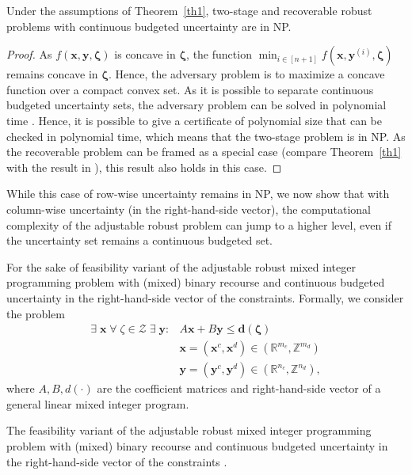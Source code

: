 \begin{corollary}\label{cor4}
Under the assumptions of Theorem~\ref{th1}, two-stage and recoverable robust problems with continuous budgeted uncertainty are in NP.
\end{corollary}
\begin{proof}
As $f(\pmb{x},\pmb{y},\pmb{\zeta})$ is concave in $\pmb{\zeta}$, the function $\min_{i\in[n+1]} f(\pmb{x},\pmb{y}^{(i)},\pmb{\zeta})$ remains concave in $\pmb{\zeta}$. Hence, the adversary problem is to maximize a concave function over a compact convex set. As it is possible to separate continuous budgeted uncertainty sets, the adversary problem can be solved in polynomial time \cite{grotschel1981ellipsoid}. Hence, it is possible to give a certificate of polynomial size that can be checked in polynomial time, which means that the two-stage problem is in NP. As the recoverable problem can be framed as a special case (compare Theorem~\ref{th1} with the result in \cite{bold2020}), this result also holds in this case.
\end{proof}


While this case of row-wise uncertainty remains in NP, we now show that 
with column-wise uncertainty (in the right-hand-side vector), 
the computational complexity of the adjustable robust problem can jump to a higher level, 
even if the uncertainty set remains a continuous budgeted set.

For the sake of  feasibility variant of the adjustable robust mixed integer programming problem with (mixed) binary recourse
and continuous budgeted uncertainty in the right-hand-side vector of the constraints.
Formally, we consider the problem
\begin{align*}
\exists\;\pmb{x}\; \forall\;\zeta \in \mathcal{Z}\; \exists\;\pmb{y} \colon & A\pmb{x} + B\pmb{y} \leq \pmb{d}(\pmb{\zeta})\\
& \pmb{x} = (\pmb{x}^c, \pmb{x}^d) \in (\mathbb{R}^{m_c}, \mathbb{Z}^{m_d})\\
& \pmb{y} = (\pmb{y}^c, \pmb{y}^d) \in (\mathbb{R}^{n_c}, \mathbb{Z}^{n_d}),
\end{align*}
where $A, B, d(\cdot)$ are the coefficient matrices and right-hand-side vector
of a general linear mixed integer program.

\begin{theorem}
\label{thm:mixed-binary-recourse}
The feasibility variant of the adjustable robust mixed integer programming problem with (mixed) binary recourse and continuous budgeted uncertainty in the right-hand-side vector of the constraints .
\end{theorem}


